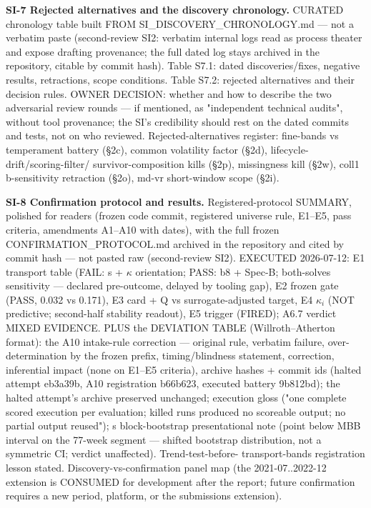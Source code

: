 \documentclass[9pt,twocolumn,twoside]{pnas-new}
\begin{document}
{\textbf{SI-7 Rejected alternatives and the discovery chronology.} CURATED
chronology table built FROM SI\_DISCOVERY\_CHRONOLOGY.md — not a verbatim
paste (second-review SI2: verbatim internal logs read as process theater
and expose drafting provenance; the full dated log stays archived in the
repository, citable by commit hash). Table S7.1: dated discoveries/fixes,
negative results, retractions, scope conditions. Table S7.2: rejected
alternatives and their decision rules. OWNER DECISION: whether and how to
describe the two adversarial review rounds — if mentioned, as "independent
technical audits", without tool provenance; the SI's credibility should
rest on the dated commits and tests, not on who reviewed.
Rejected-alternatives register: fine-bands vs temperament battery (\S2c),
common volatility factor (\S2d), lifecycle-drift/scoring-filter/
survivor-composition kills (\S2p), missingness kill (\S2w), coll1
b-sensitivity retraction (\S2o), md-vr short-window scope (\S2i).

\textbf{SI-8 Confirmation protocol and results.} Registered-protocol
SUMMARY, polished for readers (frozen code commit, registered universe
rule, E1--E5, pass criteria, amendments A1--A10 with dates), with the full
frozen CONFIRMATION\_PROTOCOL.md archived in the repository and cited by
commit hash — not pasted raw (second-review SI2). EXECUTED 2026-07-12:
E1 transport table (FAIL: s + $\kappa$ orientation; PASS: b8 + Spec-B;
both-solves sensitivity — declared pre-outcome, delayed by tooling gap),
E2 frozen gate (PASS, 0.032 vs 0.171), E3 card + Q vs surrogate-adjusted
target, E4 $\kappa_i$ (NOT predictive; second-half stability readout),
E5 trigger (FIRED); A6.7 verdict MIXED EVIDENCE. PLUS the DEVIATION TABLE
(Willroth--Atherton format): the A10 intake-rule correction — original
rule, verbatim failure, over-determination by the frozen prefix,
timing/blindness statement, correction, inferential impact (none on
E1--E5 criteria), archive hashes + commit ids (halted attempt eb3a39b,
A10 registration b66b623, executed battery 9b812bd); the halted attempt's
archive preserved unchanged; execution gloss ("one complete scored
execution per evaluation; killed runs produced no scoreable output; no
partial output reused"); s block-bootstrap presentational note (point
below MBB interval on the 77-week segment — shifted bootstrap
distribution, not a symmetric CI; verdict unaffected). Trend-test-before-
transport-bands registration lesson stated. Discovery-vs-confirmation
panel map (the 2021-07..2022-12 extension is CONSUMED for development
after the report; future confirmation requires a new period, platform, or
the submissions extension).

}
\end{document}
